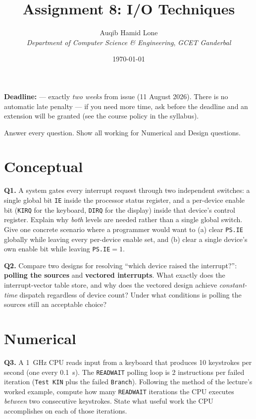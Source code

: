 \documentclass[11pt]{article}
\title{Assignment 8: I/O Techniques}
\author{Auqib Hamid Lone\\[0.3em]
  \emph{Department of Computer Science \& Engineering}, \emph{GCET Ganderbal}}
\date{\today}
\begin{document}
\maketitle

\noindent\textbf{Deadline:}  --- exactly \emph{two weeks} from issue (11 August 2026). There is no automatic late penalty --- if you need more time, ask before the deadline and an extension will be granted (see the course policy in the syllabus).

\noindent Answer every question. Show all working for Numerical and Design questions.

\section{Conceptual}

\textbf{Q1.} A system gates every interrupt request through two independent switches: a single global bit \texttt{IE} inside the processor status register, and a per-device enable bit (\texttt{KIRQ} for the keyboard, \texttt{DIRQ} for the display) inside that device's control register. Explain why \emph{both} levels are needed rather than a single global switch. Give one concrete scenario where a programmer would want to (a) clear \texttt{PS.IE} globally while leaving every per-device enable set, and (b) clear a single device's own enable bit while leaving \texttt{PS.IE}$=1$.

\textbf{Q2.} Compare two designs for resolving ``which device raised the interrupt?'': \textbf{polling the sources} and \textbf{vectored interrupts}. What exactly does the interrupt-vector table store, and why does the vectored design achieve \emph{constant-time} dispatch regardless of device count? Under what conditions is polling the sources still an acceptable choice?

\section{Numerical}

\textbf{Q3.} A 1~GHz CPU reads input from a keyboard that produces 10 keystrokes per second (one every 0.1~s). The \texttt{READWAIT} polling loop is 2 instructions per failed iteration (\texttt{Test KIN} plus the failed \texttt{Branch}). Following the method of the lecture's worked example, compute how many \texttt{READWAIT} iterations the CPU executes \emph{between} two consecutive keystrokes. State what useful work the CPU accomplishes on each of those iterations.
\end{document}
